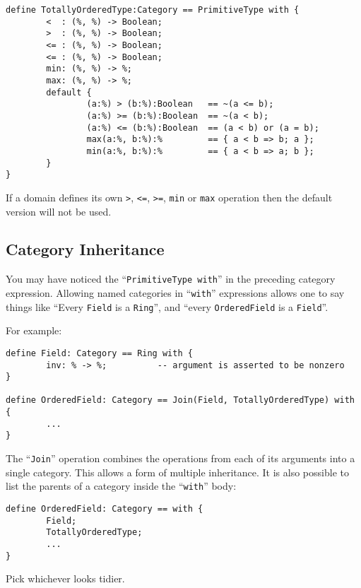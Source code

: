 \documentclass{article}
\begin{document}
\begin{small}
\begin{verbatim}
define TotallyOrderedType:Category == PrimitiveType with {
        <  : (%, %) -> Boolean;
        >  : (%, %) -> Boolean;
        <= : (%, %) -> Boolean;
        <= : (%, %) -> Boolean;
        min: (%, %) -> %;
        max: (%, %) -> %;
        default {
                (a:%) > (b:%):Boolean   == ~(a <= b);
                (a:%) >= (b:%):Boolean  == ~(a < b);
                (a:%) <= (b:%):Boolean  == (a < b) or (a = b);
                max(a:%, b:%):%         == { a < b => b; a };
                min(a:%, b:%):%         == { a < b => a; b };
        }
}
\end{verbatim}
\end{small}

If a domain defines its own
{\tt >}, {\tt <=}, {\tt >=},
{\tt min} or {\tt max} operation then
the default version will not be used.

\subsection{Category Inheritance}

You may have noticed the ``{\tt PrimitiveType with}'' in the
preceding category expression.  Allowing named categories in
``{\tt with}'' expressions allows one to say things like
``Every {\tt Field} is a {\tt Ring}'',
and ``every {\tt OrderedField} is a {\tt Field}''.

For example:

\begin{small}
\begin{verbatim}
define Field: Category == Ring with {
        inv: % -> %;          -- argument is asserted to be nonzero
}

define OrderedField: Category == Join(Field, TotallyOrderedType) with {
        ...
}
\end{verbatim}
\end{small}

The ``{\tt Join}'' operation combines the operations from each of its
arguments into a single category.  This allows a form of multiple
inheritance.  It is also possible to list the parents of a category
inside the ``{\tt with}'' body:
\begin{small}
\begin{verbatim}
define OrderedField: Category == with {
        Field;
        TotallyOrderedType;
        ...
}
\end{verbatim}
\end{small}
Pick whichever looks tidier.
\end{document}
